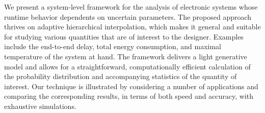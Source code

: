 We present a system-level framework for the analysis of electronic systems whose
runtime behavior dependents on uncertain parameters. The proposed approach
thrives on adaptive hierarchical interpolation, which makes it general and
suitable for studying various quantities that are of interest to the designer.
Examples include the end-to-end delay, total energy consumption, and maximal
temperature of the system at hand. The framework delivers a light generative
model and allows for a straightforward, computationally efficient calculation of
the probability distribution and accompanying statistics of the quantity of
interest. Our technique is illustrated by considering a number of applications
and comparing the corresponding results, in terms of both speed and accuracy,
with exhaustive simulations.
